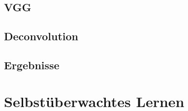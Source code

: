 \section{\textcite{XuPageSegmentationHistorical2017}}
\section{VGG}
\section{Deconvolution}
\section{Ergebnisse}

\chapter{Selbstüberwachtes Lernen}
\label{chap:selfsupervised}


